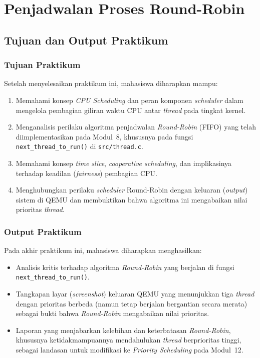 
\chapter{Penjadwalan Proses Round-Robin}
\label{chap:modul-11}

\sloppy

\section{Tujuan dan Output Praktikum}

\subsection{Tujuan Praktikum}
Setelah menyelesaikan praktikum ini, mahasiswa diharapkan mampu:
\begin{enumerate}
	\item Memahami konsep \textit{CPU Scheduling} dan peran komponen \textit{scheduler} dalam mengelola pembagian giliran waktu CPU antar \textit{thread} pada tingkat kernel.
	\item Menganalisis perilaku algoritma penjadwalan \textit{Round-Robin} (FIFO) yang telah diimplementasikan pada Modul~8, khususnya pada fungsi \texttt{next\_thread\_to\_run()} di \texttt{src/thread.c}.
	\item Memahami konsep \textit{time slice}, \textit{cooperative scheduling}, dan implikasinya terhadap keadilan (\textit{fairness}) pembagian CPU.
	\item Menghubungkan perilaku \textit{scheduler} Round-Robin dengan keluaran (\textit{output}) sistem di QEMU dan membuktikan bahwa algoritma ini mengabaikan nilai prioritas \textit{thread}.
\end{enumerate}

\subsection{Output Praktikum}
Pada akhir praktikum ini, mahasiswa diharapkan menghasilkan:
\begin{itemize}
	\item Analisis kritis terhadap algoritma \textit{Round-Robin} yang berjalan di fungsi \texttt{next\_thread\_to\_run()}.
	\item Tangkapan layar (\textit{screenshot}) keluaran QEMU yang menunjukkan tiga \textit{thread} dengan prioritas berbeda (namun tetap berjalan bergantian secara merata) sebagai bukti bahwa \textit{Round-Robin} mengabaikan nilai prioritas.
	\item Laporan yang menjabarkan kelebihan dan keterbatasan \textit{Round-Robin}, khususnya ketidakmampuannya mendahulukan \textit{thread} berprioritas tinggi, sebagai landasan untuk modifikasi ke \textit{Priority Scheduling} pada Modul~12.
\end{itemize}

